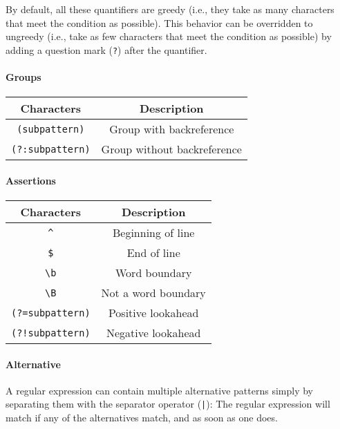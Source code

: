 By default, all these quantifiers are greedy (i.e., they take as many characters that meet the condition as possible). This behavior can be overridden to ungreedy (i.e., take as few characters that meet the condition as possible) by adding a question mark (\verb!?!) after the quantifier.

\paragraph{Groups}
\begin{center}
	\begin{tabular}{|c|c|}
		\hline
		Characters				&	Description		\\
		\hline
		\verb!(subpattern)!		&	Group with backreference	\\
		\hline
		\verb!(?:subpattern)!	&	Group without backreference\\
		\hline
	\end{tabular}
\end{center}
\paragraph{Assertions}
\begin{center}
	\begin{tabular}{|c|c|}
		\hline
		Characters				&	Description			\\
		\hline
		\verb!^!				&	Beginning of line\\
		\hline
		\verb!$!				&	End of line		\\
		\hline
		\verb!\b!				&	Word boundary	\\
		\hline
		\verb!\B!				&	Not a word boundary	\\
		\hline
		\verb!(?=subpattern)!	&	Positive lookahead	\\
		\hline
		\verb|(?!subpattern)|	&	Negative lookahead	\\
		\hline
	\end{tabular}
\end{center}
\paragraph{Alternative}
A regular expression can contain multiple alternative patterns simply by separating them with the separator operator (\verb!|!): The regular expression will match if any of the alternatives match, and as soon as one does.
